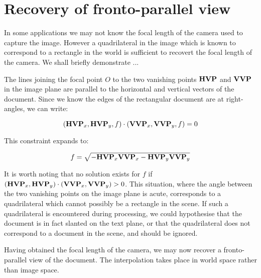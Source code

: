 \section{Recovery of fronto-parallel view}


In some applications we may not know the focal length of the camera used to capture the image.  However a quadrilateral in the image which is known to correspond to a rectangle in the world is sufficient to recovert the focal length of the camera.  We shall briefly demonstrate ...

The lines joining the focal point $O$ to the two vanishing points ${ \bf HVP }$ and ${ \bf VVP }$ in the image plane are parallel to the horizontal and vertical vectors of the document.  Since we know the edges of the rectangular document are at right-angles, we can write:

\begin{equation}
( { \bf HVP }_x , { \bf HVP }_y , f ) \cdot ( { \bf VVP }_x , { \bf VVP }_y , f ) = 0
\end{equation}

This constraint expands to:

\begin{equation}
f = \sqrt{ - { \bf HVP }_x { \bf VVP }_x - { \bf HVP }_y { \bf VVP }_y }
\end{equation}


It is worth noting that no solution exists for $f$ if $ ( { \bf HVP }_x , { \bf HVP }_y ) \cdot ( { \bf VVP }_x , { \bf VVP }_y ) > 0 $.  This situation, where the angle between the two vanishing points on the image plane is acute, corresponds to a quadrilateral which cannot possibly be a rectangle in the scene.  If such a quadrilateral is encountered during processing, we could hypothesise that the document is in fact slanted on the text plane, or that the quadrilateral does not correspond to a document in the scene, and should be ignored.

Having obtained the focal length of the camera, we may now recover a fronto-parallel view of the document.  The interpolation takes place in world space rather than image space.
